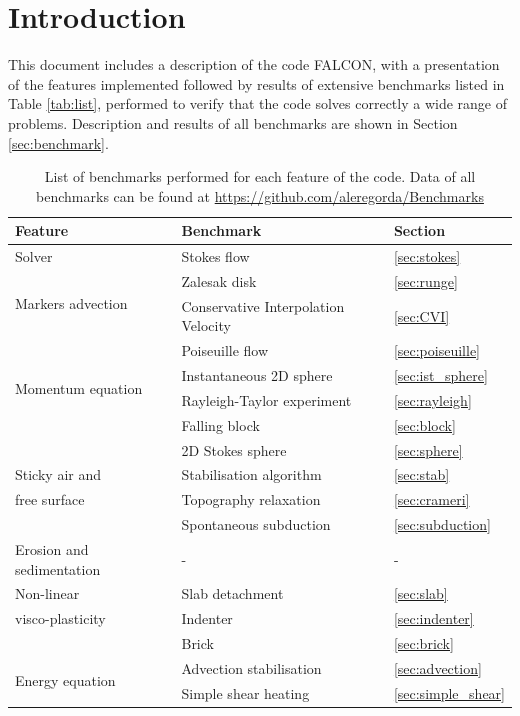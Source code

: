 \documentclass[hidelinks,10pt,a4paper]{article}
\begin{document}
\section{Introduction}\label{sec:intro}
This document includes a description of the code FALCON, with a presentation of the features implemented followed by results of extensive benchmarks listed in
Table \ref{tab:list}, performed to verify that the code solves correctly a wide range of problems. Description and results of all benchmarks are shown
in Section \ref{sec:benchmark}.

\begin{table}[H]
\caption{List of benchmarks performed for each feature of the code. Data of all benchmarks can be found at 
\url{https://github.com/aleregorda/Benchmarks}}
\centering
\begin{tabular}{| l | l | l |}
\toprule
 \textbf{Feature}  & \textbf{Benchmark} & \textbf{Section} \\
\midrule
  Solver  & Stokes flow & \ref{sec:stokes} \\
\hline
  \multirow{2}{*}{Markers advection} & Zalesak disk & \ref{sec:runge} \\
    & Conservative Interpolation Velocity & \ref{sec:CVI} \\
\hline
  \multirow{4}{*}{Momentum equation}  & Poiseuille flow & \ref{sec:poiseuille}\\
    & Instantaneous 2D sphere & \ref{sec:ist_sphere} \\
    & Rayleigh-Taylor experiment & \ref{sec:rayleigh} \\
    & Falling block & \ref{sec:block} \\
\hline
    & 2D Stokes sphere & \ref{sec:sphere} \\
    Sticky air and  & Stabilisation algorithm & \ref{sec:stab} \\
    free surface & Topography relaxation & \ref{sec:crameri} \\
  & Spontaneous subduction & \ref{sec:subduction} \\
\hline
  Erosion and sedimentation  & - & - \\
\hline
   Non-linear  & Slab detachment & \ref{sec:slab} \\
   visco-plasticity & Indenter & \ref{sec:indenter} \\
    & Brick & \ref{sec:brick} \\
\hline
  \multirow{3}{*}{Energy equation}  & Advection stabilisation & \ref{sec:advection} \\
    & Simple shear heating & \ref{sec:simple_shear} \\

\end{tabular}
\end{table}
\end{document}
